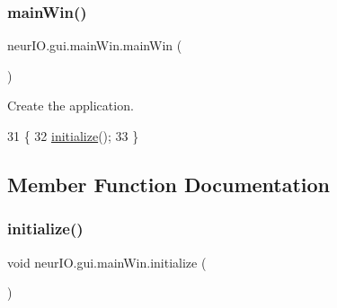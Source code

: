 \subsubsection{\texorpdfstring{main\+Win()}{mainWin()}}
{\footnotesize\ttfamily neur\+I\+O.\+gui.\+main\+Win.\+main\+Win (\begin{DoxyParamCaption}{ }\end{DoxyParamCaption})}

Create the application. 
\begin{DoxyCode}
31                      \{
32         \hyperlink{classneur_i_o_1_1gui_1_1main_win_aab47900a0e64469a9b97c6270643ef14}{initialize}();
33     \}
\end{DoxyCode}


\subsection{Member Function Documentation}
\mbox{\label{classneur_i_o_1_1gui_1_1main_win_aab47900a0e64469a9b97c6270643ef14}} 
\subsubsection{\texorpdfstring{initialize()}{initialize()}}
{\footnotesize\ttfamily void neur\+I\+O.\+gui.\+main\+Win.\+initialize (\begin{DoxyParamCaption}{ }\end{DoxyParamCaption})\hspace{0.3cm}{\ttfamily [private]}}

